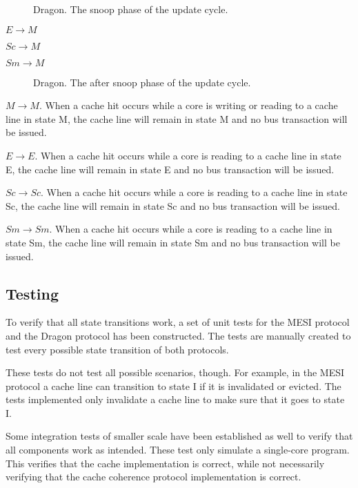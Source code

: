 \begin{figure}[H]
    \centering
    \caption{Dragon. The snoop phase of the update cycle.}
    \label{fig:dragon_snoop}
\end{figure}

$E \to M$

$Sc \to M$

$Sm \to M$


\begin{figure}[H]
    \centering
    \caption{Dragon. The after snoop phase of the update cycle.}
    \label{fig:dragon_after_snoop}
\end{figure}

$M \to M$.
When a cache hit occurs while a core is writing or reading to a cache line in state M, the cache line will remain in state M and no bus transaction will be issued.

$E \to E$.
When a cache hit occurs while a core is reading to a cache line in state E, the cache line will remain in state E and no bus transaction will be issued.

$Sc \to Sc$.
When a cache hit occurs while a core is reading to a cache line in state Sc, the cache line will remain in state Sc and no bus transaction will be issued.

$Sm \to Sm$.
When a cache hit occurs while a core is reading to a cache line in state Sm, the cache line will remain in state Sm and no bus transaction will be issued.

\subsection{Testing}
To verify that all state transitions work, a set of unit tests for the MESI protocol and the Dragon protocol has been constructed.
The tests are manually created to test every possible state transition of both protocols.

These tests do not test all possible scenarios, though.
For example, in the MESI protocol a cache line can transition to state I if it is invalidated or evicted.
The tests implemented only invalidate a cache line to make sure that it goes to state I.

Some integration tests of smaller scale have been established as well to verify that all components work as intended.
These test only simulate a single-core program. This verifies that the cache
implementation is correct, while not necessarily verifying that the cache coherence protocol
implementation is correct.
